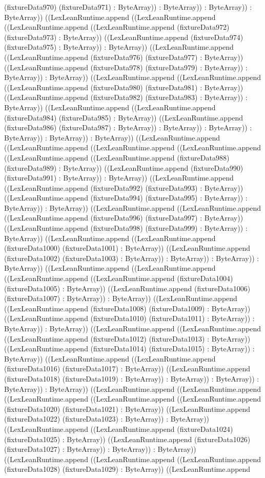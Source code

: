 \documentclass[11pt]{article}
\begin{document}
(fixtureData970) (fixtureData971) : ByteArray)) : ByteArray)) : ByteArray)) : ByteArray)) ((LexLeanRuntime.append ((LexLeanRuntime.append ((LexLeanRuntime.append ((LexLeanRuntime.append (fixtureData972) (fixtureData973) : ByteArray)) ((LexLeanRuntime.append (fixtureData974) (fixtureData975) : ByteArray)) : ByteArray)) ((LexLeanRuntime.append ((LexLeanRuntime.append (fixtureData976) (fixtureData977) : ByteArray)) ((LexLeanRuntime.append (fixtureData978) (fixtureData979) : ByteArray)) : ByteArray)) : ByteArray)) ((LexLeanRuntime.append ((LexLeanRuntime.append ((LexLeanRuntime.append (fixtureData980) (fixtureData981) : ByteArray)) ((LexLeanRuntime.append (fixtureData982) (fixtureData983) : ByteArray)) : ByteArray)) ((LexLeanRuntime.append ((LexLeanRuntime.append (fixtureData984) (fixtureData985) : ByteArray)) ((LexLeanRuntime.append (fixtureData986) (fixtureData987) : ByteArray)) : ByteArray)) : ByteArray)) : ByteArray)) : ByteArray)) : ByteArray)) ((LexLeanRuntime.append ((LexLeanRuntime.append ((LexLeanRuntime.append ((LexLeanRuntime.append ((LexLeanRuntime.append ((LexLeanRuntime.append (fixtureData988) (fixtureData989) : ByteArray)) ((LexLeanRuntime.append (fixtureData990) (fixtureData991) : ByteArray)) : ByteArray)) ((LexLeanRuntime.append ((LexLeanRuntime.append (fixtureData992) (fixtureData993) : ByteArray)) ((LexLeanRuntime.append (fixtureData994) (fixtureData995) : ByteArray)) : ByteArray)) : ByteArray)) ((LexLeanRuntime.append ((LexLeanRuntime.append ((LexLeanRuntime.append (fixtureData996) (fixtureData997) : ByteArray)) ((LexLeanRuntime.append (fixtureData998) (fixtureData999) : ByteArray)) : ByteArray)) ((LexLeanRuntime.append ((LexLeanRuntime.append (fixtureData1000) (fixtureData1001) : ByteArray)) ((LexLeanRuntime.append (fixtureData1002) (fixtureData1003) : ByteArray)) : ByteArray)) : ByteArray)) : ByteArray)) ((LexLeanRuntime.append ((LexLeanRuntime.append ((LexLeanRuntime.append ((LexLeanRuntime.append (fixtureData1004) (fixtureData1005) : ByteArray)) ((LexLeanRuntime.append (fixtureData1006) (fixtureData1007) : ByteArray)) : ByteArray)) ((LexLeanRuntime.append ((LexLeanRuntime.append (fixtureData1008) (fixtureData1009) : ByteArray)) ((LexLeanRuntime.append (fixtureData1010) (fixtureData1011) : ByteArray)) : ByteArray)) : ByteArray)) ((LexLeanRuntime.append ((LexLeanRuntime.append ((LexLeanRuntime.append (fixtureData1012) (fixtureData1013) : ByteArray)) ((LexLeanRuntime.append (fixtureData1014) (fixtureData1015) : ByteArray)) : ByteArray)) ((LexLeanRuntime.append ((LexLeanRuntime.append (fixtureData1016) (fixtureData1017) : ByteArray)) ((LexLeanRuntime.append (fixtureData1018) (fixtureData1019) : ByteArray)) : ByteArray)) : ByteArray)) : ByteArray)) : ByteArray)) ((LexLeanRuntime.append ((LexLeanRuntime.append ((LexLeanRuntime.append ((LexLeanRuntime.append ((LexLeanRuntime.append (fixtureData1020) (fixtureData1021) : ByteArray)) ((LexLeanRuntime.append (fixtureData1022) (fixtureData1023) : ByteArray)) : ByteArray)) ((LexLeanRuntime.append ((LexLeanRuntime.append (fixtureData1024) (fixtureData1025) : ByteArray)) ((LexLeanRuntime.append (fixtureData1026) (fixtureData1027) : ByteArray)) : ByteArray)) : ByteArray)) ((LexLeanRuntime.append ((LexLeanRuntime.append ((LexLeanRuntime.append (fixtureData1028) (fixtureData1029) : ByteArray)) ((LexLeanRuntime.append 
\end{document}
